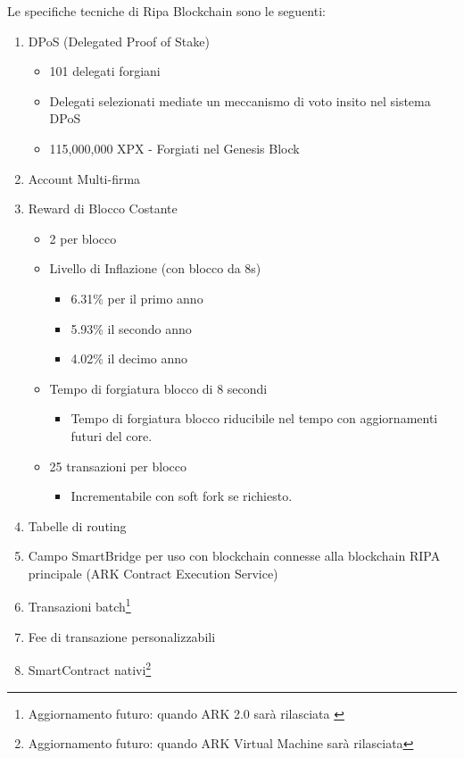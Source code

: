 \documentclass[11pt,fleqn]{book} %
\begin{document}
Le specifiche tecniche di Ripa Blockchain sono le seguenti:
\begin{enumerate}
	\item DPoS (Delegated Proof of Stake)
	\begin{itemize}
		\item 101 delegati forgiani
		\item Delegati selezionati mediate un meccanismo di voto insito nel sistema DPoS
		\item 115,000,000 XPX - Forgiati nel Genesis Block
	\end{itemize}
	\item Account Multi-firma
	\item Reward di Blocco Costante
	\begin{itemize}
		\item 2 \PHP per blocco
		\item Livello di Inflazione (con blocco da 8s)
		\begin{itemize}
			\item 6.31\% per il primo anno
			\item 5.93\% il secondo anno
			\item 4.02\% il decimo anno
		\end{itemize}
		\item Tempo di forgiatura blocco di 8 secondi
		\begin{itemize}
			\item Tempo di forgiatura blocco riducibile nel tempo con aggiornamenti futuri del core.
		\end{itemize}
		\item 25 transazioni per blocco
		\begin{itemize}
			\item Incrementabile con soft fork se richiesto.
		\end{itemize}
	\end{itemize}
	\item Tabelle di routing
	\item Campo SmartBridge per uso con blockchain connesse alla blockchain RIPA principale (ARK Contract Execution Service)
	\item Transazioni batch\footnote{Aggiornamento futuro: quando ARK 2.0 sarà rilasciata \label{note1}}
	\item Fee di transazione personalizzabili\footnotemark[\value{footnote}]
	\item SmartContract nativi\footnote{Aggiornamento futuro: quando ARK Virtual Machine sarà rilasciata}
\end{enumerate}
\end{document}
